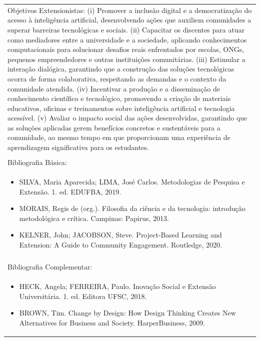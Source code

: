 \documentclass[11pt]{article}
\begin{document}
\begin{center}
\begin{longtable}{|p{4cm}|p{4cm}|p{4cm}|p{4cm}|}
\multicolumn{4}{|p{\dimexpr 16cm + 6\tabcolsep\relax}|}{Objetivos Extensionistas: (i) Promover a inclusão digital e a democratização do acesso à inteligência artificial, desenvolvendo ações que auxiliem comunidades a superar barreiras tecnológicas e sociais. (ii) Capacitar os discentes para atuar como mediadores entre a universidade e a sociedade, aplicando conhecimentos computacionais para solucionar desafios reais enfrentados por escolas, ONGs, pequenos empreendedores e outras instituições comunitárias. (iii) Estimular a interação dialógica, garantindo que a construção das soluções tecnológicas ocorra de forma colaborativa, respeitando as demandas e o contexto da comunidade atendida. (iv) Incentivar a produção e a disseminação de conhecimento científico e tecnológico, promovendo a criação de materiais educativos, oficinas e treinamentos sobre inteligência artificial e tecnologia acessível. (v) Avaliar o impacto social das ações desenvolvidas, garantindo que as soluções aplicadas gerem benefícios concretos e sustentáveis para a comunidade, ao mesmo tempo em que proporcionam uma experiência de aprendizagem significativa para os estudantes.}\\
\multicolumn{4}{|p{\dimexpr 16cm + 6\tabcolsep\relax}|}{}\\
\hline
\multicolumn{4}{|p{16cm}|}{Bibliografia Básica:}\\
\multicolumn{4}{|p{\dimexpr 16cm + 6\tabcolsep\relax}|}{%
\begin{itemize}\item SILVA, Maria Aparecida; LIMA, José Carlos. Metodologias de Pesquisa e Extensão. 1. ed. EDUFBA, 2019.
\item MORAIS, Regis de (org.). Filosofia da ciência e da tecnologia: introdução metodológica e crítica. Campinas: Papirus, 2013.
\item KELNER, John; JACOBSON, Steve. Project-Based Learning and Extension: A Guide to Community Engagement. Routledge, 2020.\end{itemize}}\\
\multicolumn{4}{|p{16cm}|}{}\\
\hline
\multicolumn{4}{|p{16cm}|}{Bibliografia Complementar:}\\
\multicolumn{4}{|p{\dimexpr 16cm + 6\tabcolsep\relax}|}{%
\begin{itemize}\item HECK, Angela; FERREIRA, Paulo. Inovação Social e Extensão Universitária. 1. ed. Editora UFSC, 2018.
\item BROWN, Tim. Change by Design: How Design Thinking Creates New Alternatives for Business and Society. HarperBusiness, 2009.

\end{itemize}}
\end{longtable}
\end{center}
\end{document}
